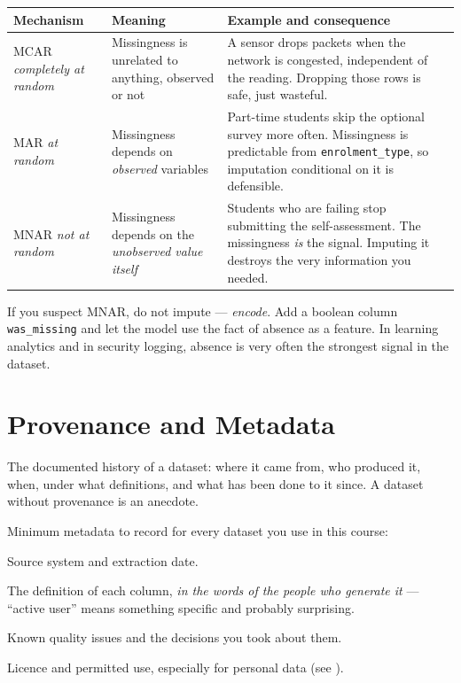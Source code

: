 \begin{longtable}{@{}L{2.6cm}L{5.4cm}L{6.4cm}@{}}
\toprule
{}
\textbf{Mechanism} & \textbf{Meaning} & \textbf{Example and consequence} \\
\midrule
\endhead
MCAR \newline \emph{completely at random} & Missingness is unrelated to anything, observed or not & A sensor drops packets when the network is congested, independent of the reading. Dropping those rows is safe, just wasteful. \\
MAR \newline \emph{at random} & Missingness depends on \emph{observed} variables & Part-time students skip the optional survey more often. Missingness is predictable from \texttt{enrolment\_type}, so imputation conditional on it is defensible. \\
MNAR \newline \emph{not at random} & Missingness depends on the \emph{unobserved value itself} & Students who are failing stop submitting the self-assessment. The missingness \emph{is} the signal. Imputing it destroys the very information you needed. \\
\bottomrule
\end{longtable}

\begin{conceptbox}
If you suspect MNAR, do not impute --- \emph{encode}. Add a boolean column
\texttt{was\_missing} and let the model use the fact of absence as a feature. In
learning analytics and in security logging, absence is very often the strongest
signal in the dataset.
\end{conceptbox}

\section{Provenance and Metadata}

\begin{definitionbox}[Provenance]
The documented history of a dataset: where it came from, who produced it, when,
under what definitions, and what has been done to it since. A dataset without
provenance is an anecdote.
\end{definitionbox}

Minimum metadata to record for every dataset you use in this course:
\begin{tight}
  \item Source system and extraction date.
  \item The definition of each column, \emph{in the words of the people who
        generate it} --- ``active user'' means something specific and probably
        surprising.
  \item Known quality issues and the decisions you took about them.
  \item Licence and permitted use, especially for personal data
        (see ).
\end{tight}

